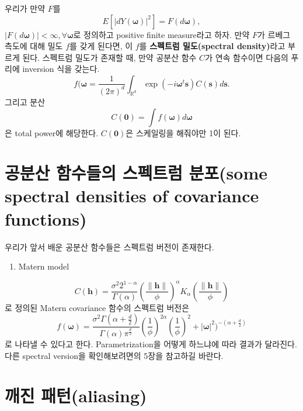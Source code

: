 \documentclass[b5paper,]{scrbook}
\providecommand{\tightlist}{%
  \setlength{\itemsep}{0pt}\setlength{\parskip}{0pt}}
\theoremstyle{plain}
\theoremstyle{definition}
\numberwithin{equation}{section}
\begin{document}
우리가 만약 \(F\)를
\[E[|dY(\boldsymbol{\omega})|^{2} ]=F(d\boldsymbol{\omega}),\]
\(|F(d\boldsymbol{\omega})|<\infty, \forall \boldsymbol{\omega}\)로 정의하고 positive finite measure라고 하자. 만약 \(F\)가 르베그 측도에 대해 밀도 \(f\)를 갖게 된다면, 이 \(f\)를 \textbf{스펙트럼 밀도(spectral density)}라고 부르게 된다. 스펙트럼 밀도가 존재할 때, 만약 공분산 함수 \(C\)가 연속 함수이면 다음의 푸리에 inversion 식을 갖는다.
\[f(\boldsymbol{\omega}=\frac{1}{(2\pi)^{d}}\int_{\mathbb{R}^{d}}\exp(-i\boldsymbol{\omega}^{t}\mathbf{s})C(\mathbf{s})d\mathbf{s}.\]
그리고 분산
\[C(\mathbf{0})=\int f(\boldsymbol{\omega})d\boldsymbol{\omega} \]
은 total power에 해당한다. \(C(\mathbf{0})\)은 스케일링을 해줘야만 1이 된다.

\hypertarget{---some-spectral-densities-of-covariance-functions}{%
\section{공분산 함수들의 스펙트럼 분포(some spectral densities of covariance functions)}\label{---some-spectral-densities-of-covariance-functions}}

우리가 앞서 배운 공분산 함수들은 스펙트럼 버전이 존재한다.

\begin{enumerate}
\def\labelenumi{\arabic{enumi}.}
\tightlist
\item
  Matern model
\end{enumerate}

\[C(\mathbf{h})=\frac{\sigma^{2}2^{1-\alpha}}{\Gamma(\alpha)}(\frac{\|\mathbf{h}\|}{\phi})^{\alpha}K_{\alpha}(\frac{\|\mathbf{h}\|}{\phi})\]
로 정의된 Matern covariance 함수의 스펙트럼 버전은
\[f(\boldsymbol{\omega})=\frac{\sigma^{2}\Gamma(\alpha+\frac{d}{2})}{\Gamma(\alpha)\pi^{\frac{d}{2}}}(\frac{1}{\phi})^{2\alpha}(\frac{1}{\phi})^{2}+|\boldsymbol{\omega}|^{2})^{-(\alpha+\frac{d}{2})}\]
로 나타낼 수 있다고 한다. Parametrization을 어떻게 하느냐에 따라 결과가 달라진다. 다른 spectral version을 확인해보려면\citep{Gelfand2010}의 5장을 참고하길 바란다.

\hypertarget{-aliasing}{%
\section{깨진 패턴(aliasing)}\label{-aliasing}}
\end{document}
